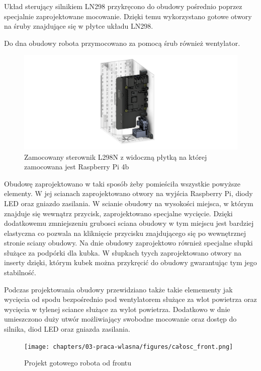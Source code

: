 Układ sterujący silnikiem LN298 przykręcono do obudowy pośrednio poprzez specjalnie zaprojektowane mocowanie. Dzięki temu wykorzystano
gotowe otwory na śruby znajdujące się w płytce układu LN298.

Do dna obudowy robota przymocowano za pomocą śrub również wentylator.

\begin{figure}[H]
    \centering
    \includegraphics[width=0.95\linewidth]{chapters/03-praca-wlasna/figures/l298n.png}
    \caption{\label{fig:steownik}Zamocowany sterownik L298N z widoczną płytką na której zamocowana jest Raspberry Pi 4b}
\end{figure}

Obudowę zaprojektowano w taki sposób żeby pomieściła wszystkie powyższe elementy. W jej scianach zaprojektowano otwory na wyjścia Raspberry Pi, 
diody LED oraz gniazdo zasilania. W scianie obudowy na wysokości miejsca, w którym znajduje się wewnątrz przycisk, zaprojektowano specjalne wycięcie.
Dzięki dodatkowemu zmniejszeniu grubosci sciana obudowy w tym miejscu jest bardziej elastyczna co pozwala na kliknięcie przycisku znajdującego
się po wewnętrznej stronie sciany obudowy. Na dnie obudowy zaprojektowo również specjalne słupki służące za podpórki dla kubka. 
W słupkach tyych zaprojektowano otwory na inserty dzięki, którym kubek można przykręcić do obudowy gwarantując tym jego stabilność.

Podczas projektowania obudowy przewidziano także takie elemementy jak wycięcia od spodu bezpośrednio pod wentylatorem służące za wlot powietrza 
oraz wycięcia w tylenej sciance służące za wylot powietrza. Dodatkowo w dnie umieszczono duży utwór możliwiający swobodne mocowanie oraz dostęp do 
silnika, diod LED oraz gniazda zasilania.

\begin{figure}[H]
    \centering
    \texttt{[image: chapters/03-praca-wlasna/figures/całosc\_front.png]}
    \caption{\label{fig:gotowy}Projekt gotowego robota od frontu}
\end{figure}